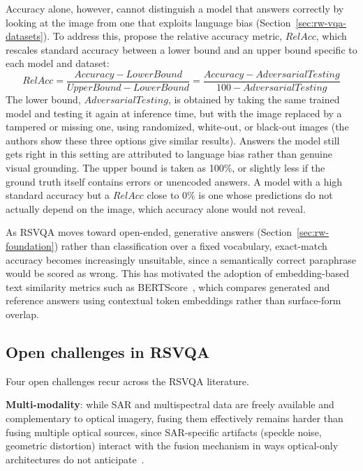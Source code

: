 Accuracy alone, however, cannot distinguish a model that answers correctly by looking at the image from one that exploits language bias (Section~\ref{sec:rw-vqa-datasets}). To address this, \textcite{chappuis2025langbias} propose the relative accuracy metric, $RelAcc$, which rescales standard accuracy between a lower bound and an upper bound specific to each model and dataset:
\begin{equation}
RelAcc = \frac{Accuracy - LowerBound}{UpperBound - LowerBound} = \frac{Accuracy - AdversarialTesting}{100 - AdversarialTesting}
\end{equation}
The lower bound, $AdversarialTesting$, is obtained by taking the same trained model and testing it again at inference time, but with the image replaced by a tampered or missing one, using randomized, white-out, or black-out images (the authors show these three options give similar results). Answers the model still gets right in this setting are attributed to language bias rather than genuine visual grounding. The upper bound is taken as 100\%, or slightly less if the ground truth itself contains errors or unencoded answers. A model with a high standard accuracy but a $RelAcc$ close to 0\% is one whose predictions do not actually depend on the image, which accuracy alone would not reveal.

As RSVQA moves toward open-ended, generative answers (Section~\ref{sec:rw-foundation}) rather than classification over a fixed vocabulary, exact-match accuracy becomes increasingly unsuitable, since a semantically correct paraphrase would be scored as wrong. This has motivated the adoption of embedding-based text similarity metrics such as BERTScore~\cite{zhang2020bertscoreevaluatingtextgeneration}, which compares generated and reference answers using contextual token embeddings rather than surface-form overlap.

\subsection{Open challenges in RSVQA}
\label{sec:rw-vqa-challenges}

Four open challenges recur across the RSVQA literature. 

\textbf{Multi-modality}: while SAR and multispectral data are freely available and complementary to optical imagery, fusing them effectively remains harder than fusing multiple optical sources, since SAR-specific artifacts (speckle noise, geometric distortion) interact with the fusion mechanism in ways optical-only architectures do not anticipate~\cite{tosato2025b}. 

